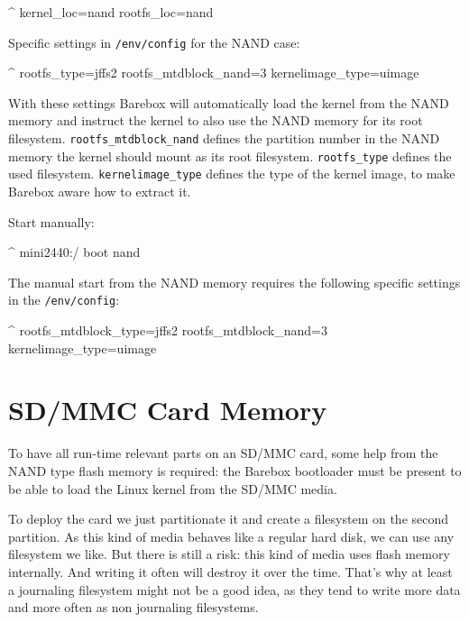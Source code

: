 \begin{ptxshell}[escapechar=|]{^}
kernel_loc=nand
rootfs_loc=nand
\end{ptxshell}

Specific settings in \texttt{/env/config} for the NAND case:

\begin{ptxshell}[escapechar=|]{^}
rootfs_type=jffs2
rootfs_mtdblock_nand=3
kernelimage_type=uimage
\end{ptxshell}

With these settings Barebox will automatically load the kernel from the NAND
memory and instruct the kernel to also use the NAND memory for its root
filesystem. \texttt{rootfs\_mtdblock\_nand} defines the partition number in the
NAND memory the kernel should mount as its root filesystem. \texttt{rootfs\_type}
defines the used filesystem. \texttt{kernelimage\_type} defines the type of the
kernel image, to make Barebox aware how to extract it.

Start manually:

\begin{ptxshell}[escapechar=|]{^}
mini2440:/ boot nand
\end{ptxshell}

The manual start from the NAND memory requires the following specific settings
in the \texttt{/env/config}:

\begin{ptxshell}[escapechar=|]{^}
rootfs_mtdblock_type=jffs2
rootfs_mtdblock_nand=3
kernelimage_type=uimage
\end{ptxshell}

\section{SD/MMC Card Memory}				\label{sec:boot_sdcard}

To have all run-time relevant parts on an SD/MMC card, some help from the
NAND type flash memory is required: the Barebox bootloader must be present
to be able to load the Linux kernel from the SD/MMC media.

To deploy the card we just partitionate it and create a filesystem on the second
partition. As this kind of media behaves like a regular hard disk, we can use
any filesystem we like. But there is still a risk: this kind of media uses flash
memory internally. And writing it often will destroy it over the time. That's why
at least a journaling filesystem might not be a good idea, as they tend to write
more data and more often as non journaling filesystems.

